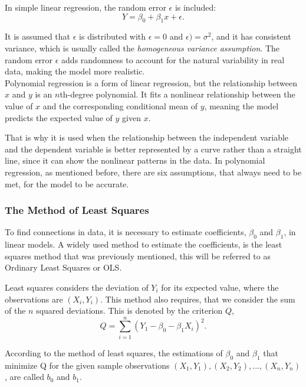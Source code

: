 \noindent In simple linear regression, the random error \( \epsilon \) is included:
\begin{equation}
Y = \beta_0 + \beta_1 x + \epsilon .
\end{equation}


\noindent It is assumed that \( \epsilon \) is distributed with $\epsilon = 0$ and $\epsilon) = \sigma^2$, and it has consistent variance, which is usually called the \textit{homogeneous variance assumption}. The random error \( \epsilon \) adds randomness to account for the natural variability in real data, making the model more realistic.
\newline\\
Polynomial regression is a form of linear regression, but the relationship between \( x \) and \( y \) is an \( n \)th-degree polynomial. It fits a nonlinear relationship between the value of \( x \) and the corresponding conditional mean of \( y \), meaning the model predicts the expected value of \( y \) given \( x \). \newline

\noindent That is why it is used when the relationship between the independent variable and the dependent variable is better represented by a curve rather than a straight line, since it can show the nonlinear patterns in the data.
In polynomial regression, as mentioned before, there are six assumptions, that always need to be met, for the model to be accurate.


\subsubsection{The Method of Least Squares}

\noindent To find connections in data, it is necessary to estimate coefficients, $\beta_0$ and $\beta_1$, in linear models. 
A widely used method to estimate the coefficients, is the least squares method that was previously mentioned, this will be referred to as Ordinary Least Squares or OLS. 

\noindent Least squares considers the deviation of $Y_i$ for  its expected value, where the observations are $(X_i, Y_i)$. 
This method also requires, that we consider the sum of the $n$ squared deviations.
This is denoted by the criterion $Q$,
\begin{equation}
Q=\sum_{i=1}^{n}(Y_1-\beta_0 - \beta_1 X_i)^2 .
\end{equation}

\noindent According to the method of least squares, the estimations of $\beta_0$ and $\beta_1$ that minimize Q for the given sample observations $(X_1,Y_1), (X_2,Y_2), ..., (X_n,Y_n)$, are called $b_0$ and $b_1$.  

